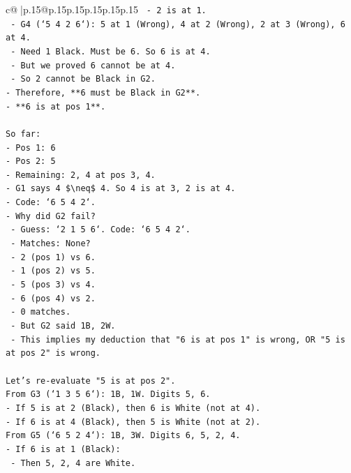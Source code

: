 \documentclass{article}
\begin{document}
{\begin{supertabular}{c@{$\;$}|p{.15\linewidth}@{}p{.15\linewidth}p{.15\linewidth}p{.15\linewidth}p{.15\linewidth}p{.15\linewidth}}
{{{\texttt{  {-} 2 is at 1.} \\
\texttt{  {-} G4 (`5 4 2 6`): 5 at 1 (Wrong), 4 at 2 (Wrong), 2 at 3 (Wrong), 6 at 4.} \\
\texttt{    {-} Need 1 Black. Must be 6. So 6 is at 4.} \\
\texttt{    {-} But we proved 6 cannot be at 4.} \\
\texttt{  {-} So 2 cannot be Black in G2.} \\
\texttt{{-} Therefore, **6 must be Black in G2**.} \\
\texttt{{-} **6 is at pos 1**.} \\
\\ 
\texttt{So far:} \\
\texttt{{-} Pos 1: 6} \\
\texttt{{-} Pos 2: 5} \\
\texttt{{-} Remaining: 2, 4 at pos 3, 4.} \\
\texttt{{-} G1 says 4 \$\textbackslash{}neq\$ 4. So 4 is at 3, 2 is at 4.} \\
\texttt{{-} Code: `6 5 4 2`.} \\
\texttt{{-} Why did G2 fail?} \\
\texttt{  {-} Guess: `2 1 5 6`. Code: `6 5 4 2`.} \\
\texttt{  {-} Matches: None?} \\
\texttt{  {-} 2 (pos 1) vs 6.} \\
\texttt{  {-} 1 (pos 2) vs 5.} \\
\texttt{  {-} 5 (pos 3) vs 4.} \\
\texttt{  {-} 6 (pos 4) vs 2.} \\
\texttt{  {-} 0 matches.} \\
\texttt{  {-} But G2 said 1B, 2W.} \\
\texttt{  {-} This implies my deduction that "6 is at pos 1" is wrong, OR "5 is at pos 2" is wrong.} \\
\\ 
\texttt{Let's re{-}evaluate "5 is at pos 2".} \\
\texttt{From G3 (`1 3 5 6`): 1B, 1W. Digits 5, 6.} \\
\texttt{{-} If 5 is at 2 (Black), then 6 is White (not at 4).} \\
\texttt{{-} If 6 is at 4 (Black), then 5 is White (not at 2).} \\
\texttt{From G5 (`6 5 2 4`): 1B, 3W. Digits 6, 5, 2, 4.} \\
\texttt{{-} If 6 is at 1 (Black):} \\
\texttt{  {-} Then 5, 2, 4 are White.} \\
}}}
\end{supertabular}}
\end{document}
